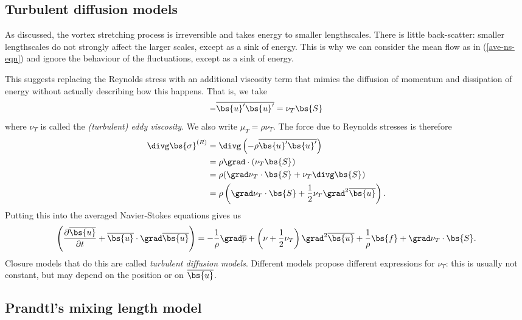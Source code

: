 \subsection{Turbulent diffusion models}

As discussed, the vortex stretching process is irreversible and takes energy to
smaller lengthscales. There is little back-scatter: smaller lengthscales do not
strongly affect the larger scales, except as a sink of energy. This is why we
can consider the mean flow as in (\ref{ave-ns-eqn}) and ignore the behaviour of
the fluctuations, except as a sink of energy.

This suggests replacing the Reynolds stress with an additional viscosity term
that mimics the diffusion of momentum and dissipation of energy without actually
describing how this happens. That is, we take
\begin{equation}
    -\overline{\bs{u}' \bs{u}'} = \nu_T \bs{S}
\end{equation}
where $\nu_T$ is called the \textit{(turbulent) eddy viscosity}. We also write
$\mu_T = \rho\nu_T$. The force due to Reynolds stresses is therefore
\begin{align}
    \divg\bs{\sigma}^{(R)} &= \divg\left(-\rho\overline{\bs{u}'\bs{u}'}\right)  \\
     &= \rho\grad\cdot(\nu_T\bs{S}) \\
     &= \rho (\grad\nu_T \cdot \bs{S} + \nu_T \divg\bs{S}) \\
     &= \rho \left(\grad\nu_T \cdot \bs{S} + \frac{1}{2} \nu_T \grad^2\overline{\bs{u}}\right).
\end{align}
Putting this into the averaged Navier-Stokes equations gives us
\begin{equation}
    \left(\frac{\partial\overline{\bs{u}}}{\partial t} +
    \overline{\bs{u}}\cdot\grad\overline{\bs{u}}\right)
    = -\frac{1}{\rho}\grad\overline{p} 
    + \left(\nu+\frac{1}{2}\nu_T\right)\grad^2\overline{\bs{u}} 
    + \frac{1}{\rho}\bs{f} 
    + \grad\nu_T \cdot \bs{S}.
    \label{ave-ns-eqn-td-model}
\end{equation}
Closure models that do this are called \textit{turbulent diffusion models}.
Different models propose different expressions for $\nu_T$: this is usually not 
constant, but may depend on the position or on $\overline{\bs{u}}$.

\subsection{Prandtl's mixing length model}

